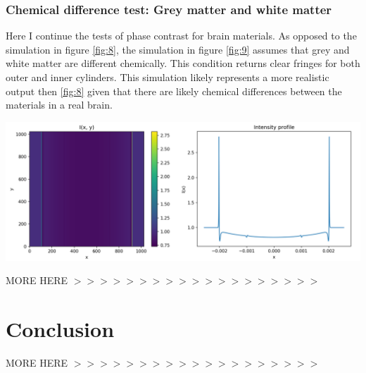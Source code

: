 \documentclass[10pt, a4paper, singlespacing]{report}
\newenvironment{Figure}
    {\par\medskip\noindent\minipage{\linewidth}}
    {\endminipage\par\medskip}
\begin{document}
\subsection{Chemical difference test: Grey matter and white matter}
Here I continue the tests of phase contrast for brain materials. As opposed to the simulation in figure \ref{fig:8}, the simulation in figure \ref{fig:9} assumes that grey and white matter are different chemically. This condition returns clear fringes for both outer and inner cylinders. This simulation likely represents a more realistic output then \ref{fig:8}
given that there are likely chemical differences between the materials in a real brain.
\begin{Figure}\label{fig:9}
\centering
\includegraphics[width=\linewidth]{optimistic_case.pdf}
\end{Figure}
MORE HERE $>>>>>>>>>>>>>>>>>>>$

\chapter{Conclusion}\label{Conclusion}
MORE HERE $>>>>>>>>>>>>>>>>>>>$
\end{document}

